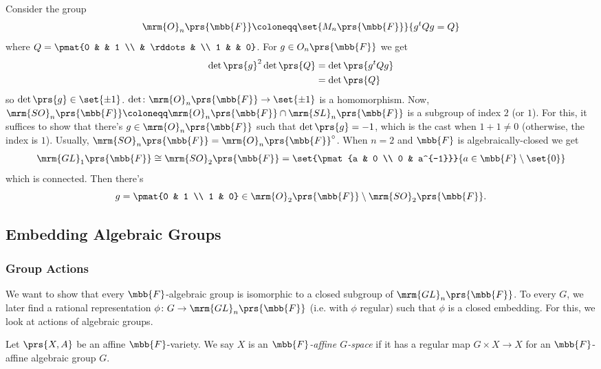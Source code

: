 \documentclass[10pt,a4paper,twoside,openany,hidelinks]{book}
\begin{document}
\begin{example}
Consider the group
\[\mrm{O}_n\prs{\mbb{F}} \coloneqq \set{M_n\prs{\mbb{F}}}{g^t Q g = Q}\]
where $Q = \pmat{0 & & 1  \\ & \rddots & \\ 1 & & 0}$.
For $g \in O_n\prs{\mbb{F}}$ we get
\begin{align*}
\det\prs{g}^2 \det\prs{Q} &= \det\prs{g^t Q g}
\\&=
\det\prs{Q}
\end{align*}
so $\det\prs{g} \in \set{\pm 1}$.
$\det \colon \mrm{O}_n\prs{\mbb{F}} \to \set{\pm 1}$ is a homomorphism.
Now, $\mrm{SO}_n\prs{\mbb{F}} \coloneqq \mrm{O}_n\prs{\mbb{F}} \cap \mrm{SL}_n\prs{\mbb{F}}$ is a subgroup of index $2$ (or $1$). For this, it suffices to show that there's $g \in \mrm{O}_n\prs{\mbb{F}}$ such that $\det\prs{g} = -1$, which is the cast when $1+1 \neq 0$ (otherwise, the index is $1$).
Usually, $\mrm{SO}_n\prs{\mbb{F}} = \mrm{O}_n\prs{\mbb{F}}^\circ$. When $n=2$ and $\mbb{F}$ is algebraically-closed we get
\begin{align*}
\mrm{GL}_1\prs{\mbb{F}} \cong \mrm{SO}_2\prs{\mbb{F}} = \set{\pmat{a & 0 \\ 0 & a^{-1}}}{a \in \mbb{F} \setminus \set{0}}
\end{align*}
which is connected. Then there's \[g = \pmat{0 & 1 \\ 1 & 0} \in \mrm{O}_2\prs{\mbb{F}} \setminus \mrm{SO}_2\prs{\mbb{F}}\text{.}\]
\end{example}

\subsection{Embedding Algebraic Groups}

\subsubsection{Group Actions}

We want to show that every $\mbb{F}$-algebraic group is isomorphic to a closed subgroup of $\mrm{GL}_n\prs{\mbb{F}}$. To every $G$, we later find a rational representation $\phi \colon G \to \mrm{GL}_n\prs{\mbb{F}}$ (i.e. with $\phi$ regular) such that $\phi$ is a closed embedding.
For this, we look at actions of algebraic groups.

\begin{definition}
Let $\prs{X,A}$ be an affine $\mbb{F}$-variety. We say $X$ is an \emph{$\mbb{F}$-affine $G$-space} if it has a regular map $G \times X \to X$ for an $\mbb{F}$-affine algebraic group $G$.
\end{definition}
\end{document}
